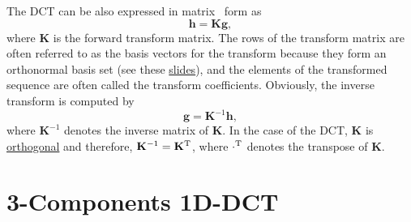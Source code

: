 The DCT can be also expressed in matrix~\cite{sayood2017introduction}
form as
\begin{equation}
  {\mathbf h} = {\mathbf K}{\mathbf g},
\end{equation}
where ${\mathbf K}$ is the forward transform matrix. The rows of the
transform matrix are often referred to as the basis vectors for the
transform because they form an orthonormal basis set (see these
\href{https://cseweb.ucsd.edu/classes/fa17/cse166-a/lec13.pdf}{slides}),
and the elements of the transformed sequence are often called the
transform coefficients. Obviously, the inverse transform is computed
by
\begin{equation}
  {\mathbf g} = {\mathbf K}^{-1}{\mathbf h},
\end{equation}
where ${\mathbf K}^{-1}$ denotes the inverse matrix of ${\mathbf
  K}$. In the case of the DCT, ${\mathbf K}$ is
\href{https://en.wikipedia.org/wiki/Orthogonal_matrix}{orthogonal} and
therefore, ${\mathbf K}^{-1}={\mathbf K}^{\text T}$, where
$\cdot^{\text T}$ denotes the transpose of ${\mathbf K}$.

\section{3-Components 1D-DCT}

